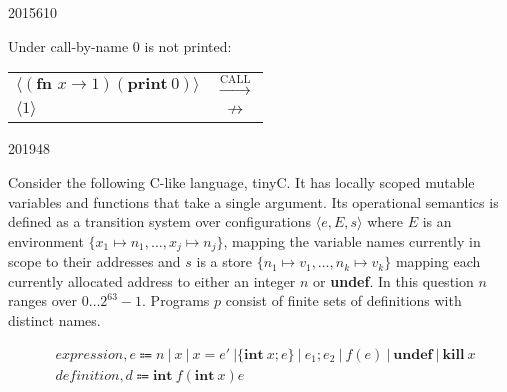 \documentclass[10pt,\jkfside,a4paper]{article}
\begin{document}
\begin{examquestion}{2015}{6}{10}
\begin{enumerate}[label=(\alph*)]
Under call-by-name 0 is not printed:
\begin{table}[H]
\centering
\begin{tabular}{l c}
$\langle (\textbf{fn }x \to 1)(\mathbf{print} \ 0) \rangle$ &
$\stackrel{\text{CALL}}{\to}$ \\
$\langle 1 \rangle$ &
$\not\to$ \\
\end{tabular}
\end{table}

\end{enumerate}

\end{examquestion}

\begin{examquestion}{2019}{4}{8}

Consider the following C-like language, tinyC. It has locally scoped mutable
variables and functions that take a single argument. Its operational
semantics is defined as a transition system over configurations $ \langle e,
 E, s \rangle $ where $E$ is an environment $\{x_1\mapsto n_1, \dots, x_j
 \mapsto n_j\}$, mapping the variable names currently in scope to their
addresses and $s$ is a store $\{n_1 \mapsto v_1, \dots, n_k \mapsto v_k\}$
mapping each currently allocated address to either an integer $n$ or
\textbf{undef}. In this question $n$ ranges over $0\dots2^{63}-1$. Programs
$p$ consist of finite sets of definitions with distinct names.

\[
\begin{split}
& \textit{expression}, e \Coloneqq n \ | \ x \ | \ x=e' \ | \{\textbf{int} \ x;
e\} \ | \ e_1; e_2 \ | \ f(e) \ | \ \textbf{undef} \ | \ \textbf{kill} \ x\\
& \textit{definition}, d \Coloneqq \textbf{int} \ f(\textbf{int} \ x){e} \\
\end{split}
\]


\end{examquestion}
\end{document}
